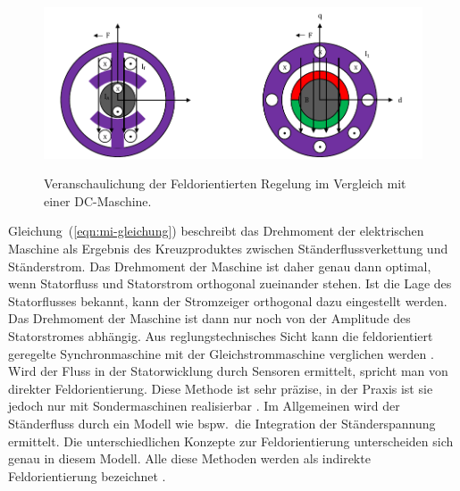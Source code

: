 \begin{figure}[h!]
	\centering
	\includegraphics{_Bilder/foc-dc-ac.pdf}
	\label{fig:foc-dc-ac}
	\caption{Veranschaulichung der Feldorientierten Regelung im Vergleich mit einer DC-Maschine.}
\end{figure}

Gleichung~(\ref{eqn:mi-gleichung}) beschreibt das Drehmoment der elektrischen Maschine als Ergebnis des Kreuzproduktes zwischen Ständerflussverkettung und Ständerstrom.
Das Drehmoment der Maschine ist daher genau dann optimal, wenn Statorfluss und Statorstrom orthogonal zueinander stehen.
Ist die Lage des Statorflusses bekannt, kann der Stromzeiger orthogonal dazu eingestellt werden.
Das Drehmoment der Maschine ist dann nur noch von der Amplitude des Statorstromes abhängig.
Aus reglungstechnisches Sicht kann die feldorientiert geregelte Synchronmaschine mit der Gleichstrommaschine verglichen werden \autocite{Thur2006}.
Wird der Fluss in der Statorwicklung durch Sensoren ermittelt, spricht man von direkter Feldorientierung.
Diese Methode ist sehr präzise, in der Praxis ist sie jedoch nur mit Sondermaschinen realisierbar \autocite{Thur2006}.
Im Allgemeinen wird der Ständerfluss durch ein Modell wie bspw.\ die Integration der Ständerspannung ermittelt.
Die unterschiedlichen Konzepte zur Feldorientierung unterscheiden sich genau in diesem Modell.
Alle diese Methoden werden als indirekte Feldorientierung bezeichnet \autocite{Thur2006}.

